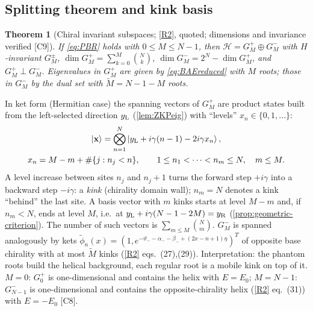 \documentclass[11pt,a4paper]{article}
\newtheorem{theorem}{Theorem}[section]
\theoremstyle{definition}
\newcommand{\Hil}{\mathcal H}
\newcommand{\ver}[1]{\textsf{[#1]}}   %
\begin{document}
\subsection{Splitting theorem and kink basis}\label{sec:splitting}
\begin{theorem}[Chiral invariant subspaces; \ref{R2}, quoted; dimensions and invariance verified \ver{C9}]\label{thm:splitting}
If \eqref{eq:PBR} holds with $0\le M\le N-1$, then $\Hil=G^+_M\oplus G^-_M$ with $H$-invariant $G^\pm_M$, $\dim G^+_M=\sum_{k=0}^M\binom Nk$, $\dim G^-_M=2^N-\dim G^+_M$, and $G^+_M\perp G^-_M$. Eigenvalues in $G^+_M$ are given by \eqref{eq:BAEreduced} with $M$ roots; those in $G^-_M$ by the dual set with $\widetilde M=N-1-M$ roots.
\end{theorem}
In ket form (Hermitian case) the spanning vectors of $G^+_M$ are product states built from the left-selected direction $y_{\rm L}$ (\cref{lem:ZKPeig}) with ``levels'' $x_n\in\{0,1,\dots\}$:
\begin{equation}\label{eq:kinkbasis}
\begin{gathered}\ket{\mathbf x}=\bigotimes_{n=1}^N\ket{y_{\rm L}+i\gamma(n-1)-2i\gamma x_n},\\ x_n=M-m+\#\{j:n_j<n\},\qquad 1\le n_1<\dots<n_m\le N,\quad m\le M .\end{gathered}
\end{equation}
A level increase between sites $n_j$ and $n_j+1$ turns the forward step $+i\gamma$ into a backward step $-i\gamma$: a \emph{kink} (chirality domain wall); $n_m=N$ denotes a kink ``behind'' the last site. A basis vector with $m$ kinks starts at level $M-m$ and, if $n_m<N$, ends at level $M$, i.e.\ at $y_{\rm L}+i\gamma(N-1-2M)=y_{\rm R}$ (\cref{prop:geometric-criterion}). The number of such vectors is $\sum_{m\le M}\binom Nm$. $G^-_M$ is spanned analogously by kets $\tilde\phi_n(x)=(1,e^{-\vartheta_--\alpha_--\beta_-+(2x-n+1)\eta})^T$ of opposite base chirality with at most $\widetilde M$ kinks (\ref{R2} eqs.~(27),(29)). Interpretation: the phantom roots build the helical background, each regular root is a mobile kink on top of it. $M=0$: $G_0^+$ is one-dimensional and contains the helix with $E=E_0$; $M=N-1$: $G^-_{N-1}$ is one-dimensional and contains the opposite-chirality helix (\ref{R2} eq.~(31)) with $E=-E_0$ \ver{C8}.
\end{document}
